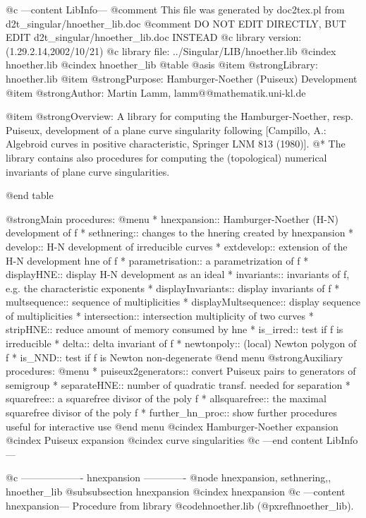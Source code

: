 @c ---content LibInfo---
@comment This file was generated by doc2tex.pl from d2t_singular/hnoether_lib.doc
@comment DO NOT EDIT DIRECTLY, BUT EDIT d2t_singular/hnoether_lib.doc INSTEAD
@c library version: (1.29.2.14,2002/10/21)
@c library file: ../Singular/LIB/hnoether.lib
@cindex hnoether.lib
@cindex hnoether_lib
@table @asis
@item @strong{Library:}
hnoether.lib
@item @strong{Purpose:}
   Hamburger-Noether (Puiseux) Development
@item @strong{Author:}
Martin Lamm, lamm@@mathematik.uni-kl.de

@item @strong{Overview:}
A library for computing the Hamburger-Noether, resp. Puiseux, development
of a plane curve singularity following [Campillo, A.: Algebroid curves
in positive characteristic, Springer LNM 813 (1980)]. @*
The library contains also procedures for computing the (topological)
numerical invariants of plane curve singularities.

@end table

@strong{Main procedures:}
@menu
* hnexpansion:: Hamburger-Noether (H-N) development of f
* sethnering:: changes to the hnering created by hnexpansion
* develop:: H-N development of irreducible curves
* extdevelop:: extension of the H-N development hne of f
* parametrisation:: a parametrization of f
* displayHNE:: display H-N development as an ideal
* invariants:: invariants of f, e.g. the characteristic exponents
* displayInvariants:: display invariants of f
* multsequence:: sequence of multiplicities
* displayMultsequence:: display sequence of multiplicities
* intersection:: intersection multiplicity of two curves
* stripHNE:: reduce amount of memory consumed by hne
* is_irred:: test if f is irreducible
* delta:: delta invariant of f
* newtonpoly:: (local) Newton polygon of f
* is_NND:: test if f is Newton non-degenerate
@end menu
@strong{Auxiliary procedures:}
@menu
* puiseux2generators:: convert Puiseux pairs to generators of semigroup
* separateHNE:: number of quadratic transf. needed for separation
* squarefree:: a squarefree divisor of the poly f
* allsquarefree:: the maximal squarefree divisor of the poly f
* further_hn_proc:: show further procedures useful for interactive use
@end menu
@cindex Hamburger-Noether expansion
@cindex Puiseux expansion
@cindex curve singularities
@c ---end content LibInfo---

@c ------------------- hnexpansion -------------
@node hnexpansion, sethnering,, hnoether_lib
@subsubsection hnexpansion
@cindex hnexpansion
@c ---content hnexpansion---
Procedure from library @code{hnoether.lib} (@pxref{hnoether_lib}).

